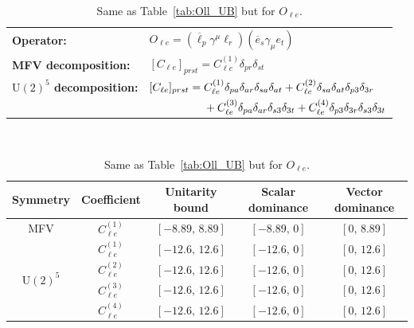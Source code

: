 \begin{table}[tbp]
\centering
{\small
\begin{tabular}{ll}
    \textbf{Operator:} &
        $\boxed{O_{\ell e} = (\overline\ell_p \gamma^\mu \ell_r)(\overline e_s \gamma_\mu e_t)}$ \\[0.2cm]
    \textbf{MFV decomposition:} &
        $[C_{\ell e}]_{prst} = C_{\ell e}^{(1)}\delta_{pr}\delta_{st}$ \\[0.15cm]
    \textbf{$\mathrm{U}(2)^5$ decomposition:} &
        $[C_{\ell e}]_{prst} =
            C_{\ell e}^{(1)}\Pij{p}{r}{a}\Pij{s}{t}{a}
            + C_{\ell e}^{(2)}\Pij{s}{t}{a}\delta_{p3}\delta_{3r}$ \\
        & $\phantom{[C_{\ell e}]_{prst} ={}}+ C_{\ell e}^{(3)}\Pij{p}{r}{a}\delta_{s3}\delta_{3t}
            + C_{\ell e}^{(4)}\delta_{p3}\delta_{3r}\delta_{s3}\delta_{3t}$ \\
\end{tabular}
\\[0.3cm]
\renewcommand{\arraystretch}{1.3}
\begin{tabular}{ccccc}
    \toprule
    \rowcolor{hdrcolor}
    \textbf{Symmetry} & \textbf{Coefficient}
        & \textbf{Unitarity bound}
        & \textbf{Scalar dominance}
        & \textbf{Vector dominance} \\
    \midrule
    \multirow{1}{*}{MFV}
        & $C_{\ell e}^{(1)}$ & $[-8.89,\, 8.89]$ & $[-8.89,\, 0]$ & $[0,\, 8.89]$ \\
    \midrule
    \multirow{4}{*}{$\mathrm{U}(2)^5$}
        & $C_{\ell e}^{(1)}$ & $[-12.6,\, 12.6]$ & $[-12.6,\, 0]$ & $[0,\, 12.6]$ \\
        & $C_{\ell e}^{(2)}$ & $[-12.6,\, 12.6]$ & $[-12.6,\, 0]$ & $[0,\, 12.6]$ \\
        & $C_{\ell e}^{(3)}$ & $[-12.6,\, 12.6]$ & $[-12.6,\, 0]$ & $[0,\, 12.6]$ \\
        & $C_{\ell e}^{(4)}$ & $[-12.6,\, 12.6]$ & $[-12.6,\, 0]$ & $[0,\, 12.6]$ \\
    \bottomrule
\end{tabular}}
\caption{Same as Table~\ref{tab:Oll_UB} but for $O_{\ell e}$.}
\label{tab:Ole_UB}
\end{table}

